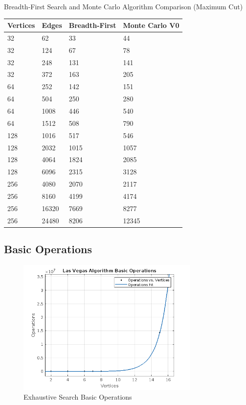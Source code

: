 \documentclass[]{revdetua}
\begin{document}
\begin{table}[!ht]
    \centering
    Breadth-First Search and Monte Carlo Algorithm Comparison (Maximum Cut)
    \begin{tabular}{|l|l|l|l|}
    \hline
        Vertices & Edges & Breadth-First & Monte Carlo V0 \\ \hline
        32 & 62 & 33 & 44 \\ \hline
        32 & 124 & 67 & 78 \\ \hline
        32 & 248 & 131 & 141 \\ \hline
        32 & 372 & 163 & 205 \\ \hline
        64 & 252 & 142 & 151 \\ \hline
        64 & 504 & 250 & 280 \\ \hline
        64 & 1008 & 446 & 540 \\ \hline
        64 & 1512 & 508 & 790 \\ \hline
        128 & 1016 & 517 & 546 \\ \hline
        128 & 2032 & 1015 & 1057 \\ \hline
        128 & 4064 & 1824 & 2085 \\ \hline
        128 & 6096 & 2315 & 3128 \\ \hline
        256 & 4080 & 2070 & 2117 \\ \hline
        256 & 8160 & 4199 & 4174 \\ \hline
        256 & 16320 & 7669 & 8277 \\ \hline
        256 & 24480 & 8206 & 12345 \\ \hline
    \end{tabular}
\end{table}

\subsection{Basic Operations}

\begin{figure}[H]
    \centering
    \includegraphics[width=9cm]{Las Vegas Algorithm/Las Vegas Algorithm Basic Operations.png}
    \caption{Exhaustive Search Basic Operations}
\end{figure}
\end{document}
